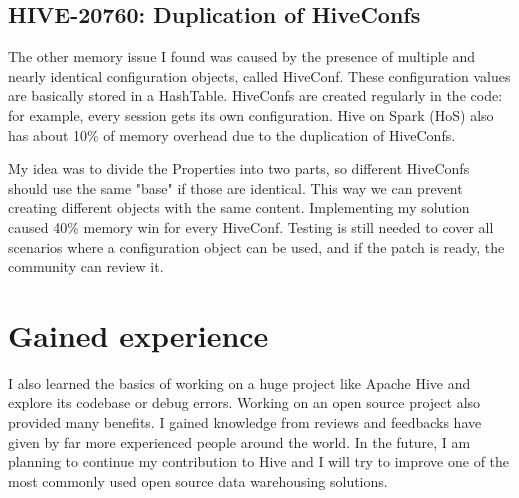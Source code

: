 \subsection{HIVE-20760: Duplication of HiveConfs}
The other memory issue I found was caused by the presence of multiple and nearly identical configuration objects, called HiveConf. These configuration values are basically stored in a HashTable. HiveConfs are created regularly in the code: for example, every session gets its own configuration. Hive on Spark (HoS) also has about 10\% of memory overhead due to the duplication of HiveConfs. 

My idea was to divide the Properties into two parts, so different HiveConfs should use the same "base" if those are identical. This way we can prevent creating different objects with the same content. Implementing my solution caused 40\% memory win for every HiveConf. Testing is still needed to cover all scenarios where a configuration object can be used, and if the patch is ready, the community can review it.

\section{Gained experience}
I also learned the basics of working on a huge project like Apache Hive and explore its codebase or debug errors. Working on an open source project also provided many benefits. I gained knowledge from reviews and feedbacks have given by far more experienced people around the world. In the future, I am planning to continue my contribution to Hive and I will try to improve one of the most commonly used open source data warehousing solutions.